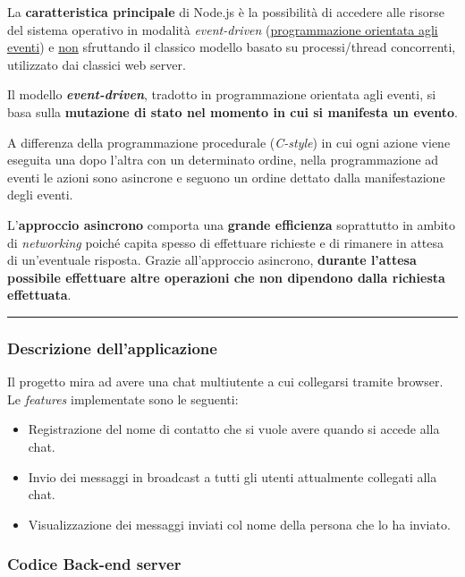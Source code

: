 \documentclass[a4paper]{article}
\newcommand{\longline}{\noindent\rule{\textwidth}{0.4pt}}
\begin{document}
	\noindent
	La \textbf{caratteristica principale} di Node.js è la possibilità di accedere alle risorse del sistema operativo in modalità \emph{event-driven} (\href{https://it.wikipedia.org/wiki/Programmazione_a_eventi}{programmazione orientata agli eventi}) e \underline{non} sfruttando il classico modello basato su processi/thread concorrenti, utilizzato dai classici web server.\newline
	
	\noindent
	Il modello \textbf{\emph{event-driven}}, tradotto in programmazione orientata agli eventi, si basa sulla \textbf{mutazione di stato nel momento in cui si manifesta un evento}.
	
	A differenza della programmazione procedurale (\emph{C-style}) in cui ogni azione viene eseguita una dopo l'altra con un determinato ordine, nella programmazione ad eventi le azioni sono asincrone e seguono un ordine dettato dalla manifestazione degli eventi.\newline
	
	\noindent
	L'\textbf{approccio asincrono} comporta una \textcolor{Green4}{\textbf{grande efficienza}} soprattutto in ambito di \emph{networking} poiché capita spesso di effettuare richieste e di rimanere in attesa di un'eventuale risposta. Grazie all'approccio asincrono, \textbf{durante l'attesa possibile effettuare altre operazioni che non dipendono dalla richiesta effettuata}.
	
	\longline
	
	\subsubsection{Descrizione dell'applicazione}
	
	Il progetto mira ad avere una chat multiutente a cui collegarsi tramite browser. Le \emph{features} implementate sono le seguenti:
	\begin{itemize}
		\item Registrazione del nome di contatto che si vuole avere quando si accede alla chat.
		
		\item Invio dei messaggi in broadcast a tutti gli utenti attualmente collegati alla chat.
	
		\item Visualizzazione dei messaggi inviati col nome della persona che lo ha inviato.
	\end{itemize}\newpage

	\subsubsection{Codice Back-end server}\label{codice Back-end server}
	
\end{document}
